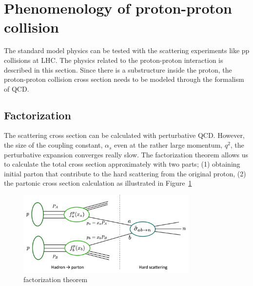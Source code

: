 \section{Phenomenology of proton-proton collision}
The standard model physics can be tested with the scattering experiments like pp collisions at LHC.
The physics related to the proton-proton interaction is described in this section. 
Since there is a substructure inside the proton, the proton-proton collision cross section needs to be modeled through the formalism of QCD.

\subsection{Factorization}
\label{subsec:factorization}

The scattering cross section can be calculated with perturbative QCD. 
However, the size of the coupling constant, $\alpha_s$ even at the rather large momentum, $q^2$, the perturbative expansion converges really slow.
The factorization theorem \cite{} allows us to calculate the total cross section approximately with two parts; 
(1) obtaining initial parton that contribute to the hard scattering from the original proton, 
(2) the partonic cross section calculation as illustrated in Figure~\ref{fig:factorization}

\begin{figure}[tbp]
\begin{center}
 \includegraphics[width=0.8\textwidth,keepaspectratio]{figures/factorization}
\caption{
 factorization theorem 
}
\label{fig:factorization}
\end{center}
\end{figure}

